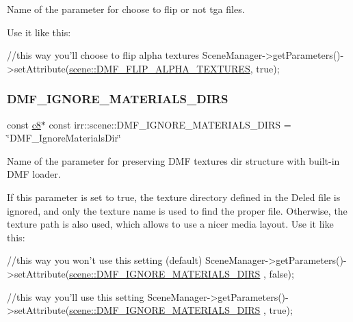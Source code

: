 Name of the parameter for choose to flip or not tga files. 

Use it like this\+: 
\begin{DoxyCode}
\textcolor{comment}{//this way you'll choose to flip alpha textures}
SceneManager->getParameters()->setAttribute(\hyperlink{namespaceirr_1_1scene_acdc1ddd0bfeb4118a5d8f3ea953717f6}{scene::DMF\_FLIP\_ALPHA\_TEXTURES}, \textcolor{keyword}{
      true});
\end{DoxyCode}
 \mbox{\label{namespaceirr_1_1scene_ae996d826263cf504dd0260d0a096b0d0}} 
\subsubsection{\texorpdfstring{D\+M\+F\+\_\+\+I\+G\+N\+O\+R\+E\+\_\+\+M\+A\+T\+E\+R\+I\+A\+L\+S\+\_\+\+D\+I\+RS}{DMF\_IGNORE\_MATERIALS\_DIRS}}
{\footnotesize\ttfamily const \hyperlink{namespaceirr_a9395eaea339bcb546b319e9c96bf7410}{c8}$\ast$ const irr\+::scene\+::\+D\+M\+F\+\_\+\+I\+G\+N\+O\+R\+E\+\_\+\+M\+A\+T\+E\+R\+I\+A\+L\+S\+\_\+\+D\+I\+RS = \char`\"{}D\+M\+F\+\_\+\+Ignore\+Materials\+Dir\char`\"{}}



Name of the parameter for preserving D\+MF textures dir structure with built-\/in D\+MF loader. 

If this parameter is set to true, the texture directory defined in the Deled file is ignored, and only the texture name is used to find the proper file. Otherwise, the texture path is also used, which allows to use a nicer media layout. Use it like this\+: 
\begin{DoxyCode}
\textcolor{comment}{//this way you won't use this setting (default)}
SceneManager->getParameters()->setAttribute(\hyperlink{namespaceirr_1_1scene_ae996d826263cf504dd0260d0a096b0d0}{scene::DMF\_IGNORE\_MATERIALS\_DIRS}
      , \textcolor{keyword}{false});
\end{DoxyCode}
 
\begin{DoxyCode}
\textcolor{comment}{//this way you'll use this setting}
SceneManager->getParameters()->setAttribute(\hyperlink{namespaceirr_1_1scene_ae996d826263cf504dd0260d0a096b0d0}{scene::DMF\_IGNORE\_MATERIALS\_DIRS}
      , \textcolor{keyword}{true});
\end{DoxyCode}
 \mbox{\label{namespaceirr_1_1scene_a2a6e8bd33eaec1815e3e16a59c269fb5}} 
